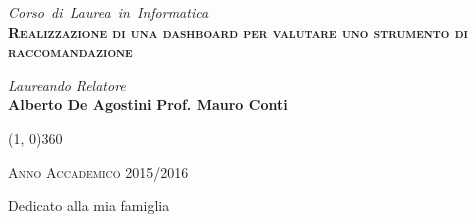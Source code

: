 \documentclass[a4paper, 12pt, twoside, openright]{book}
\begin{document}
\begin{titlepage}
\begin{center}
\vspace{1cm}
\emph{\Large{Corso~di~Laurea~in~Informatica}} \\
\vspace{1.5cm}
\scshape{\Large{\bfseries{Realizzazione di una dashboard per valutare uno strumento di raccomandazione}}} \\
\end{center}

\vfill
\begin{normalsize}
\begin{flushleft}
  \hspace{45pt} \textit{Laureando} \hspace{160pt} \textit{Relatore}\\
  \vspace{5pt}
  \hspace{30pt} \large{\textbf{Alberto De Agostini}} \hspace{70pt} \large{\textbf{Prof. Mauro Conti}}\\
  \vspace{10pt}
\end{flushleft}
\end{normalsize}

\vfill
\begin{center}
\hspace{-0.2cm}
\line(1, 0){360}

\textsc{Anno Accademico 2015/2016}
\end{center}
\end{titlepage}


\cleardoublepage %
\thispagestyle{empty} %

\null
\vspace{2cm}
\begin{flushright}
{\fontsize{20}{22}\selectfont\calligra Dedicato alla mia famiglia}
\end{flushright}
\vfill

%
\end{document}
